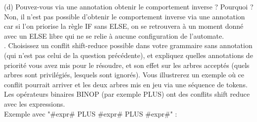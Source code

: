 \documentclass{report}
\begin{document}
    \quad (d) Pouvez-vous via une annotation obtenir le comportement inverse ? Pourquoi ?\\

    \quad Non, il n'est pas possible d'obtenir le comportement inverse via une annotation car si l'on priorise la règle IF sans ELSE, on se retrouvera à un moment donné avec un ELSE libre qui ne se relie à aucune configuration de l'automate.\\

    . Choisissez un conflit shift-reduce possible dans votre grammaire sans annotation (qui
    n'est pas celui de la question précédente), et expliquez quelles annotations de priorité
    vous avez mis pour le résoudre, et son effet sur les arbres acceptés (quels arbres sont
    privilégiés, lesquels sont ignorés). Vous illustrerez un exemple où ce conflit pourrait
    arriver et les deux arbres mis en jeu via une séquence de tokens.\\

    \quad Les opérateurs binaires BINOP (par exemple PLUS) ont des conflits shift reduce avec les expressions.\\

    \quad Exemple avec "\#expr\# PLUS \#expr\# PLUS \#expr\#"  :\\
\end{document}
